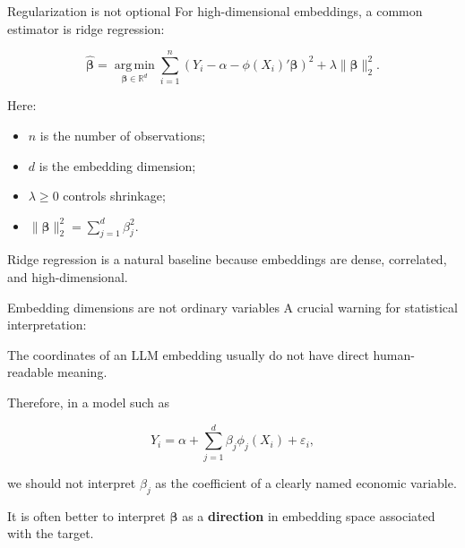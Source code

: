 \documentclass[aspectratio=169]{beamer}
\newcommand{\R}{\mathbb{R}}
\newcommand{\argmin}{\operatorname*{arg\,min}}
\newcommand{\vect}[1]{\boldsymbol{#1}}
\begin{document}
\begin{frame}{Regularization is not optional}
\large
For high-dimensional embeddings, a common estimator is ridge regression:

\[
\widehat{\vect{\beta}}
=
\argmin_{\vect{\beta} \in \R^d}
\sum_{i=1}^{n}\left(Y_i-\alpha-\phi(X_i)'\vect{\beta}\right)^2
+
\lambda\|\vect{\beta}\|_2^2.
\]

\vspace{0.2cm}

Here:
\begin{itemize}
  \item \(n\) is the number of observations;
  \item \(d\) is the embedding dimension;
  \item \(\lambda \geq 0\) controls shrinkage;
  \item \(\|\vect{\beta}\|_2^2=\sum_{j=1}^{d}\beta_j^2\).
\end{itemize}

\vspace{0.2cm}

\begin{greenbox}
Ridge regression is a natural baseline because embeddings are dense, correlated, and high-dimensional.
\end{greenbox}
\end{frame}

\begin{frame}{Embedding dimensions are not ordinary variables}
\large
A crucial warning for statistical interpretation:

\vspace{0.3cm}

\begin{redbox}
The coordinates of an LLM embedding usually do not have direct human-readable meaning.
\end{redbox}

\vspace{0.3cm}

Therefore, in a model such as

\[
Y_i = \alpha + \sum_{j=1}^{d}\beta_j\phi_j(X_i)+\varepsilon_i,
\]

we should not interpret \(\beta_j\) as the coefficient of a clearly named economic variable.

\vspace{0.25cm}

It is often better to interpret \(\vect{\beta}\) as a \textbf{direction} in embedding space associated with the target.
\end{frame}
\end{document}
